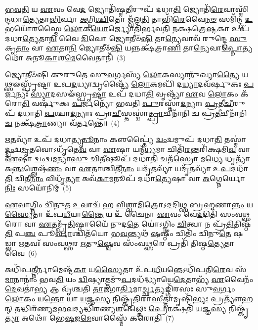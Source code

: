 \-\ul{𑌭}\-\-\ul{𑌵}\-\-\ul{𑌤𑌿} 𑌯 \ul{𑌏}\-𑌵𑌂 𑌵𑍇\-\ul{𑌦} 𑌜𑍍𑌯𑍋𑌤𑌿᳴𑌷𑍍𑌮\-\ul{𑌤𑍀}\-𑌰𑍁𑌪᳴ 𑌦𑌧𑌾\-\ul{𑌤𑌿} 𑌜𑍍𑌯𑍋𑌤𑌿᳴\-\ul{𑌰𑍇}\-𑌵𑌾𑌸𑍍𑌮𑌿᳴𑌨𑍍𑌦𑌧𑌾\-\ul{𑌤𑍍𑌯𑍇}\-𑌤𑌾\-\ul{𑌭𑌿}\-𑌰𑍍𑌵𑌾 \ul{𑌅}\-𑌗𑍍𑌨𑌿\-\ul{𑌶𑍍𑌚𑌿}\-𑌤𑍋 𑌜𑍍𑌵᳴𑌲\-\ul{𑌤𑌿} 𑌤𑌾𑌭𑌿᳴\-\ul{𑌰𑍇}\-𑌵𑍈\-\ul{𑌨}\-\-\ul{𑍞} 𑌸𑌮𑌿᳴𑌨𑍍𑌦𑍍𑌧 \ul{𑌉}\-𑌭𑌯𑍋᳴𑌰𑌸𑍍𑌮𑍈 \ul{𑌲𑍋}\-𑌕\-\ul{𑌯𑍋}\-𑌰𑍍𑌜𑍍𑌯𑍋𑌤𑌿᳴𑌰𑍍𑌭𑌵𑌤𑌿 𑌨𑌕𑍍𑌷𑌤𑍍𑌰𑍇\-\ul{𑌷𑍍𑌟}\-𑌕𑌾 𑌉𑌪᳴ 𑌦𑌧𑌾\-\ul{𑌤𑍍𑌯𑍇}\-𑌤𑌾\-\ul{𑌨𑌿} 𑌵𑍈 \ul{𑌦𑌿}\-𑌵𑍋 𑌜𑍍𑌯𑍋𑌤𑍀𑍞᳴\-\ul{𑌷𑌿} 𑌤𑌾\-\ul{𑌨𑍍𑌯𑍇}\-𑌵𑌾𑌵᳴ 𑌰𑍁𑌨𑍍𑌦𑍍𑌧𑍇 \ul{𑌸𑍁}\-𑌕𑍃\-\ul{𑌤𑌾𑌂} 𑌵𑌾 \ul{𑌏}\-𑌤𑌾\-\ul{𑌨𑌿} 𑌜𑍍𑌯𑍋𑌤𑍀𑍞᳴\-\ul{𑌷𑌿} 𑌯𑌨𑍍𑌨𑌕𑍍𑌷᳴𑌤𑍍𑌰𑌾\-\ul{𑌣𑌿} 𑌤𑌾\-\ul{𑌨𑍍𑌯𑍇}\-𑌵𑌾\-\ul{𑌪𑍍𑌨𑍋}\-𑌤𑍍𑌯𑌥𑍋᳴ 𑌅𑌨𑍂\-\ul{𑌕𑌾}\-𑌶\-\ul{𑌮𑍇}\-𑌵𑍈𑌤𑌾𑌨𑌿᳴~(3)

𑌜𑍍𑌯𑍋𑌤𑍀𑍞᳴𑌷𑌿 𑌕𑍁𑌰𑍁𑌤𑍇 𑌸𑍁\-\ul{𑌵}\-𑌰𑍍𑌗𑌸𑍍𑌯᳴ \ul{𑌲𑍋}\-𑌕𑌸𑍍𑌯𑌾𑌨𑍁᳴𑌖𑍍𑌯𑌾\-\ul{𑌤𑍍𑌯𑍈} 𑌯𑌥𑍍𑌸𑍟𑌸𑍍𑌪𑍃᳴𑌷𑍍𑌟𑌾 𑌉𑌪\-\ul{𑌦}\-𑌧𑍍𑌯𑌾𑌦𑍍𑌵𑍃𑌷𑍍𑌟𑍍𑌯𑍈᳴ \ul{𑌲𑍋}\-𑌕𑌮𑌪𑌿᳴ 𑌦\-\ul{𑌧𑍍𑌯𑌾}\-𑌦𑌵᳴𑌰𑍍\mbox{}𑌷𑍁𑌕𑌃 \ul{𑌪}\-𑌰𑍍𑌜𑌨𑍍𑌯𑌃᳴ \ul{𑌸𑍍𑌯𑌾}\-𑌦𑌸𑍟᳴𑌸𑍍𑌪𑍃\-\ul{𑌷𑍍𑌟𑌾} 𑌉𑌪᳴ 𑌦𑌧𑌾\-\ul{𑌤𑌿} 𑌵𑍃𑌷𑍍𑌟𑍍𑌯𑌾᳴ \ul{𑌏}\-𑌵 \ul{𑌲𑍋}\-𑌕𑌂 𑌕᳴𑌰𑍋\-\ul{𑌤𑌿} 𑌵𑌰𑍍\mbox{}𑌷𑍁᳴𑌕𑌃 \ul{𑌪}\-𑌰𑍍𑌜𑌨𑍍𑌯𑍋᳴ 𑌭𑌵𑌤𑌿 \ul{𑌪𑍁}\-𑌰𑌸𑍍𑌤𑌾᳴\-\ul{𑌦}\-𑌨𑍍𑌯𑌾𑌃 \ul{𑌪𑍍𑌰}\-𑌤𑍀\-\ul{𑌚𑍀}\-𑌰𑍁𑌪᳴ 𑌦𑌧𑌾𑌤𑌿 \ul{𑌪}\-𑌶𑍍𑌚𑌾\-\ul{𑌦}\-𑌨𑍍𑌯𑌾𑌃 𑌪𑍍𑌰𑌾\-\ul{𑌚𑍀}\-𑌸𑍍𑌤𑌸𑍍𑌮𑌾॑\-\ul{𑌤𑍍𑌪𑍍𑌰𑌾}\-𑌚𑍀𑌨𑌾᳴𑌨𑌿 𑌚 𑌪𑍍𑌰\-\ul{𑌤𑍀}\-𑌚𑍀𑌨𑌾᳴𑌨𑌿 \ul{𑌚} 𑌨𑌕𑍍𑌷᳴\-\ul{𑌤𑍍𑌰𑌾}\-𑌣𑍍𑌯𑌾 𑌵᳴𑌰𑍍𑌤𑌨𑍍𑌤𑍇॥~(4)

{\anuvakamend[{𑌭𑍍𑌰𑌾𑌤𑍃᳴𑌵𑍍𑌯𑍋 \ul{𑌲𑍋}\-𑌕 \ul{𑌏}\-𑌵𑍈𑌤𑌾𑌨𑍍𑌯𑍇𑌕᳴𑌚𑌤𑍍𑌵𑌾𑌰𑌿𑍞𑌶𑌚𑍍𑌚}]}%

\-\ul{𑌋}\-\-\ul{𑌤}\-𑌵𑍍𑌯𑌾᳴ 𑌉𑌪᳴ 𑌦𑌧𑌾𑌤𑍍𑌯𑍃\-\ul{𑌤𑍂}\-𑌨𑌾𑌂 𑌕𑍢𑌪𑍍𑌤𑍍𑌯𑍈॑ \ul{𑌦𑍍𑌵𑌂}\-𑌦𑍍𑌵𑌮𑍁𑌪᳴ 𑌦𑌧𑌾\-\ul{𑌤𑌿} 𑌤𑌸𑍍𑌮𑌾॑\-\ul{𑌦𑍍𑌦𑍍𑌵𑌂}\-𑌦𑍍𑌵\-\ul{𑌮𑍃}\-𑌤𑌵𑍋\-𑌽𑌧𑍃᳴𑌤𑍇\-\ul{𑌵} 𑌵𑌾 \ul{𑌏}\-𑌷𑌾 𑌯𑌨𑍍𑌮᳴\-\ul{𑌧𑍍𑌯}\-𑌮𑌾 𑌚𑌿𑌤𑌿᳴\-\ul{𑌰}\-𑌨𑍍𑌤𑌰𑌿᳴𑌕𑍍𑌷𑌮𑌿\-\ul{𑌵} 𑌵𑌾 \ul{𑌏}\-𑌷𑌾 \ul{𑌦𑍍𑌵𑌂}\-𑌦𑍍𑌵\-\ul{𑌮}\-𑌨𑍍𑌯𑌾\-\ul{𑌸𑍁} 𑌚𑌿\-\ul{𑌤𑍀}\-𑌷𑍂𑌪᳴ 𑌦𑌧𑌾\-\ul{𑌤𑌿} 𑌚𑌤᳴\-\ul{𑌸𑍍𑌰𑍋} 𑌮\-\ul{𑌧𑍍𑌯𑍇} 𑌧𑍃𑌤𑍍𑌯𑌾᳴ 𑌅\-\ul{𑌨𑍍𑌤𑌃}\-𑌶𑍍𑌲𑍇𑌷᳴\-\ul{𑌣𑌂} 𑌵𑌾 \ul{𑌏}\-𑌤𑌾𑌶𑍍𑌚𑌿𑌤𑍀᳴\-\ul{𑌨𑌾𑌂} 𑌯𑌦𑍃᳴\-\ul{𑌤}\-𑌵𑍍𑌯𑌾᳴ 𑌯𑌦𑍃᳴\-\ul{𑌤}\-𑌵𑍍𑌯𑌾᳴ 𑌉\-\ul{𑌪}\-𑌦𑌧𑌾᳴\-\ul{𑌤𑌿} 𑌚𑌿𑌤𑍀\-\ul{𑌨𑌾𑌂} 𑌵𑌿𑌧𑍃᳴\-\ul{𑌤𑍍𑌯𑌾} 𑌅𑌵᳴\-\ul{𑌕𑌾}\-𑌮𑌨𑍂𑌪᳴ 𑌦𑌧𑌾\-\ul{𑌤𑍍𑌯𑍇}\-𑌷𑌾 𑌵𑌾 \ul{𑌅}\-𑌗𑍍𑌨𑍇𑌰𑍍𑌯𑍋\-\ul{𑌨𑌿𑌃} 𑌸𑌯𑍋᳴𑌨𑌿𑌮𑍍~(5)

\-\ul{𑌏}\-𑌵𑌾𑌗𑍍𑌨𑌿𑌂 𑌚𑌿᳴𑌨𑍁𑌤 \ul{𑌉}\-𑌵𑌾𑌚᳴ 𑌹 \ul{𑌵𑌿}\-𑌶𑍍𑌵𑌾\-\ul{𑌮𑌿}\-𑌤𑍍𑌰𑍋\-𑌽\-\ul{𑌦}\-𑌦𑌿𑌥𑍍𑌸 𑌬𑍍𑌰\-\ul{𑌹𑍍𑌮}\-𑌣𑌾\-\ul{𑌨𑍍𑌨𑌂} 𑌯\-\ul{𑌸𑍍𑌯𑍈}\-𑌤𑌾 𑌉᳴𑌪\-\ul{𑌧𑍀}\-𑌯𑌾\-\ul{𑌨𑍍𑌤𑍈} 𑌯 𑌉᳴ 𑌚𑍈𑌨𑌾 \ul{𑌏}\-𑌵𑌂 𑌵𑍇\-\ul{𑌦}\-𑌦𑌿𑌤𑌿᳴ 𑌸𑌂𑌵\-\ul{𑌥𑍍𑌸}\-𑌰𑍋 𑌵𑌾 \ul{𑌏}\-𑌤𑌮𑍍𑌪𑍍𑌰᳴\-\ul{𑌤𑌿}\-𑌷𑍍𑌠𑌾𑌯𑍈᳴ 𑌨𑍁𑌦\-\ul{𑌤𑍇} 𑌯𑍋॑\-𑌽𑌗𑍍𑌨𑌿𑌂 \ul{𑌚𑌿}\-𑌤𑍍𑌵𑌾 𑌨 𑌪𑍍𑌰᳴\-\ul{𑌤𑌿}\-𑌤𑌿𑌷𑍍𑌠᳴\-\ul{𑌤𑌿} 𑌪\-\ul{𑌞𑍍𑌚} 𑌪𑍂\-\ul{𑌰𑍍𑌵𑌾}\-𑌶𑍍𑌚𑌿𑌤᳴𑌯𑍋 𑌭\-\ul{𑌵}\-𑌨𑍍𑌤𑍍𑌯𑌥᳴ \ul{𑌷}\-𑌷𑍍𑌠𑍀𑌂 𑌚𑌿𑌤𑌿𑌂᳴ 𑌚𑌿𑌨𑍁\-\ul{𑌤𑍇} 𑌷𑌡𑍍𑌵𑌾 \ul{𑌋}\-𑌤𑌵𑌃᳴ 𑌸𑌂𑌵\-\ul{𑌥𑍍𑌸}\-𑌰 \ul{𑌋}\-𑌤𑍁\-\ul{𑌷𑍍𑌵𑍇}\-𑌵 𑌸𑌂᳴𑌵\-\ul{𑌥𑍍𑌸}\-𑌰𑍇 𑌪𑍍𑌰𑌤𑌿᳴ 𑌤𑌿𑌷𑍍𑌠\-\ul{𑌤𑍍𑌯𑍇}\-𑌤𑌾 𑌵𑍈~(6)

𑌅𑌧𑌿᳴𑌪\-\ul{𑌤𑍍𑌨𑍀}\-𑌰𑍍𑌨𑌾𑌮𑍇𑌷𑍍𑌟᳴\-\ul{𑌕𑌾} 𑌯\-\ul{𑌸𑍍𑌯𑍈}\-𑌤𑌾 𑌉᳴𑌪\-\ul{𑌧𑍀}\-𑌯𑌨𑍍𑌤𑍇\-𑌽𑌧𑌿᳴𑌪𑌤𑌿\-\ul{𑌰𑍇}\-𑌵 𑌸᳴\-\ul{𑌮𑌾}\-𑌨𑌾𑌨𑌾𑌂॑ 𑌭𑌵\-\ul{𑌤𑌿} 𑌯𑌂 \ul{𑌦𑍍𑌵𑌿}\-𑌷𑍍𑌯𑌾𑌤𑍍𑌤𑌮𑍁᳴\-\ul{𑌪}\-𑌦𑌧᳴𑌦𑍍𑌧𑍍𑌯𑌾𑌯𑍇\-\ul{𑌦𑍇}\-𑌤𑌾𑌭𑍍𑌯᳴ \ul{𑌏}\-𑌵𑍈𑌨𑌂᳴ \ul{𑌦𑍇}\-𑌵𑌤𑌾॑\-\ul{𑌭𑍍𑌯} 𑌆 𑌵𑍃᳴𑌶𑍍𑌚𑌤𑌿 \ul{𑌤𑌾}\-𑌜𑌗𑌾\-\ul{𑌰𑍍𑌤𑌿}\-𑌮𑌾\-\ul{𑌰𑍍𑌚𑍍𑌛}\-𑌤𑍍𑌯𑌙𑍍𑌗𑌿᳴𑌰𑌸𑌃 𑌸𑍁\-\ul{𑌵}\-𑌰𑍍𑌗𑌂 \ul{𑌲𑍋}\-𑌕𑌂 𑌯\-\ul{𑌨𑍍𑌤𑍋} 𑌯𑌾 \ul{𑌯}\-𑌜𑍍𑌞\-\ul{𑌸𑍍𑌯} 𑌨𑌿𑌷𑍍𑌕𑍃᳴\-\ul{𑌤𑌿}\-𑌰𑌾\-\ul{𑌸𑍀}\-𑌤𑍍𑌤𑌾𑌮𑍃𑌷𑌿᳴\-\ul{𑌭𑍍𑌯𑌃} 𑌪𑍍𑌰𑌤𑍍𑌯𑍗᳴\-\ul{𑌹}\-𑌨𑍍 𑌤𑌦𑍍𑌧𑌿𑌰᳴𑌣𑍍𑌯𑌮𑌭\-\ul{𑌵}\-𑌦𑍍𑌯𑌦𑍍𑌧𑌿᳴𑌰𑌣𑍍𑌯\-\ul{𑌶}\-𑌲𑍍𑌕𑍈𑌃 \ul{𑌪𑍍𑌰𑍋}\-𑌕𑍍𑌷𑌤𑌿᳴ \ul{𑌯}\-𑌜𑍍𑌞\-\ul{𑌸𑍍𑌯} 𑌨𑌿𑌷𑍍𑌕𑍃᳴\-\ul{𑌤𑍍𑌯𑌾} 𑌅𑌥𑍋᳴ 𑌭𑍇\-\ul{𑌷}\-𑌜\-\ul{𑌮𑍇}\-𑌵𑌾𑌸𑍍𑌮𑍈᳴ 𑌕𑌰𑍋𑌤𑌿~(7)

